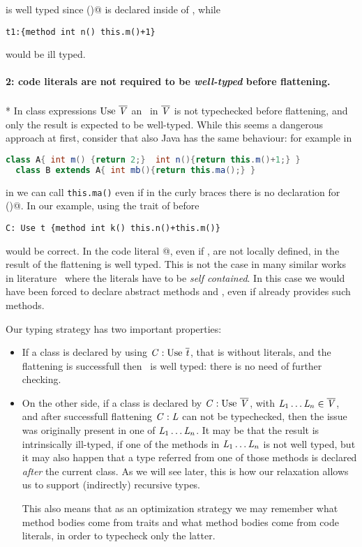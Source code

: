 \noindent \Q@t@ is well typed since \Q@m()@ is declared inside of \Q@t@, while

\saveSpace\begin{lstlisting}
t1:{method int n() this.m()+1} 
\end{lstlisting}\saveSpace
\noindent would be ill typed.

\paragraph{2: code literals are not required to be \emph{well-typed} before flattening.}${}_{}$\\*
In class expressions  $\use\ \overline\mV$
an \mL\ in $\overline{\mathit{V}}$ is not typechecked before flattening, and only the result is expected to be well-typed.
While this seems a dangerous approach at first, consider that also Java has the same behaviour:
for example in
\saveSpace\begin{lstlisting}[language=Java]
  class A{ int m() {return 2;}  int n(){return this.m()+1;} }
  class B extends A{ int mb(){return this.ma();} }
\end{lstlisting}\saveSpace
\noindent in \Q@B@ we can call \lstinline{this.ma()} even if in the curly braces there is no declaration for \Q@ma()@.
In our example, using the trait \Q@t@ of before

\saveSpace\begin{lstlisting}
C: Use t {method int k() this.n()+this.m()}
\end{lstlisting}\saveSpace
\noindent would be correct. In the code literal
@, 
 even if \Q@n@, \Q@m@ are not locally defined, in 
\name the result of the flattening is well typed.
This is not the case in many similar works in literature~\cite{deep,Bettini2015282,Bergel2007} where the
literals have to be \emph{self contained}. In this case we would have been forced to
declare abstract methods \Q@n@ and \Q@m@, even if \Q@t@ already 
provides such methods.

Our typing strategy has two important properties:
\begin{itemize}
\item If a class is declared by using $\mC : \use\ \overline\mt$, that is without literals,
and the flattening is successfull then \mC\ is well typed: there is no need of further checking.
\item On the other side, if a class is declared by $\mC : \use\ \overline\mV$, with
$\mathit{L}_1\ldots\mathit{L}_n \in \overline{\mathit{V}}$, and after successfull flattening $\mathit{C} : \mathit{L}$ can not be typechecked,
then the issue was originally present in one of $\mathit{L}_1\ldots\mathit{L}_n$.
It may be that the result is intrinsically ill-typed, if one of the methods in $\mathit{L}_1\ldots\mathit{L}_n$ is not well typed,
but it may also happen that a type referred from one of those methods
is declared \emph{after} the current class. As we will see later, this
is how our relaxation allows us to support (indirectly) recursive types.

This also means that as an optimization strategy
 we may remember what method bodies come from traits and what method bodies come from code literals, in order to typecheck only the latter.
 \end{itemize}

